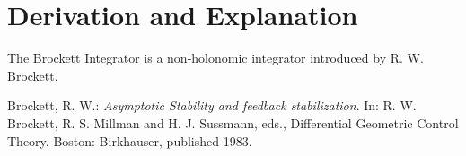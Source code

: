 \documentclass[10pt,a4paper]{article}
\begin{document}
	
	\section{Derivation and Explanation} %
	
	The Brockett Integrator is a non-holonomic integrator introduced by R. W. Brockett.
	
	
	\begin{thebibliography}{10}		
		Brockett, R. W.: 
		\textit{Asymptotic Stability and feedback stabilization}. In: R. W. Brockett, R. S. Millman and H. J. Sussmann, eds., Differential Geometric Control Theory. Boston: Birkhauser, published 1983.
	\end{thebibliography}
\end{document}

